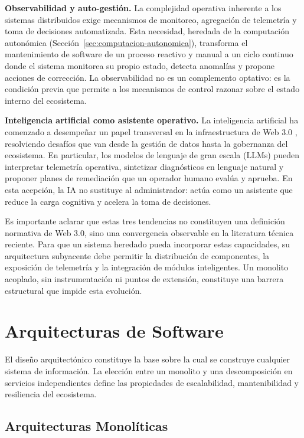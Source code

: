 \textbf{Observabilidad y auto-gesti\'{o}n.} La complejidad operativa inherente a los sistemas distribuidos exige mecanismos de monitoreo, agregaci\'{o}n de telemetr\'{i}a y toma de decisiones automatizada. Esta necesidad, heredada de la computaci\'{o}n auton\'{o}mica (Secci\'{o}n~\ref{sec:computacion-autonomica}), transforma el mantenimiento de software de un proceso reactivo y manual a un ciclo continuo donde el sistema monitorea su propio estado, detecta anomal\'{i}as y propone acciones de correcci\'{o}n. La observabilidad no es un complemento optativo: es la condici\'{o}n previa que permite a los mecanismos de control razonar sobre el estado interno del ecosistema.

\textbf{Inteligencia artificial como asistente operativo.} La inteligencia artificial ha comenzado a desempe\~{n}ar un papel transversal en la infraestructura de Web 3.0 \cite{shen2023aiweb3}, resolviendo desaf\'{i}os que van desde la gesti\'{o}n de datos hasta la gobernanza del ecosistema. En particular, los modelos de lenguaje de gran escala (LLMs) pueden interpretar telemetr\'{i}a operativa, sintetizar diagn\'{o}sticos en lenguaje natural y proponer planes de remediaci\'{o}n que un operador humano eval\'{u}a y aprueba. En esta acepci\'{o}n, la IA no sustituye al administrador: act\'{u}a como un asistente que reduce la carga cognitiva y acelera la toma de decisiones.

Es importante aclarar que estas tres tendencias no constituyen una definici\'{o}n normativa de Web 3.0, sino una convergencia observable en la literatura t\'{e}cnica reciente. Para que un sistema heredado pueda incorporar estas capacidades, su arquitectura subyacente debe permitir la distribuci\'{o}n de componentes, la exposici\'{o}n de telemetr\'{i}a y la integraci\'{o}n de m\'{o}dulos inteligentes. Un monolito acoplado, sin instrumentaci\'{o}n ni puntos de extensi\'{o}n, constituye una barrera estructural que impide esta evoluci\'{o}n.

\section{Arquitecturas de Software}

El dise\~{n}o arquitect\'{o}nico constituye la base sobre la cual se construye
cualquier sistema de información. La elecci\'{o}n entre un monolito y una
descomposici\'{o}n en servicios independientes define las propiedades de
escalabilidad, mantenibilidad y resiliencia del ecosistema.

\subsection{Arquitecturas Monol\'{i}ticas}

